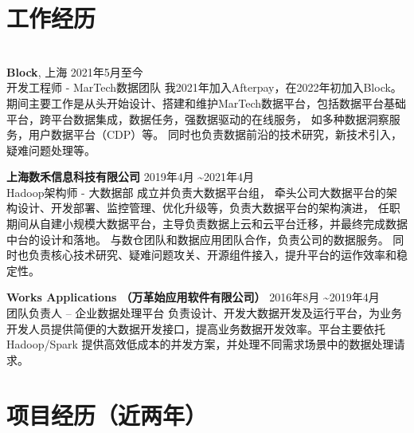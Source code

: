 \documentclass{res}[8.5pt]
\begin{document}
\thispagestyle{empty} %

\address{{\bf 地址:} 虹口区天宝路466弄, 200086 \hspace{0.25in}  {\bf 电话:} 18017661124 \hspace{0.25in}  {\bf   Email:} dd.famous@gmail.com}

\begin{resume}

\section{{工作经历}}
\vspace{-12pt}
\hrulefill\\
{\bf Block}, 上海 \hfill 2021年5月至今 \\
开发工程师 - MarTech数据团队  \hspace{0.25in} 我2021年加入Afterpay，在2022年初加入Block。
期间主要工作是从头开始设计、搭建和维护MarTech数据平台，包括数据平台基础平台，跨平台数据集成，数据任务，强数据驱动的在线服务，
如多种数据洞察服务，用户数据平台（CDP）等。
同时也负责数据前沿的技术研究，新技术引入，疑难问题处理等。

\vspace{-10pt}
{\bf 上海数禾信息科技有限公司} \hfill 2019年4月  \textasciitilde 2021年4月\\
Hadoop架构师 - 大数据部    \hspace{0.25in} 
成立并负责大数据平台组，
牵头公司大数据平台的架构设计、开发部署、监控管理、优化升级等，负责大数据平台的架构演进，
任职期间从自建小规模大数据平台，主导负责数据上云和云平台迁移，并最终完成数据中台的设计和落地。
与数仓团队和数据应用团队合作，负责公司的数据服务。
同时也负责核心技术研究、疑难问题攻关、开源组件接入，提升平台的运作效率和稳定性。


\vspace{-10pt}
{\bf Works Applications （万革始应用软件有限公司）} \hfill 2016年8月 \textasciitilde 2019年4月\\
团队负责人 – 企业数据处理平台 \hspace{0.25in} 
负责设计、开发大数据开发及运行平台，为业务开发人员提供简便的大数据开发接口，提高业务数据开发效率。平台主要依托 Hadoop/Spark 提供高效低成本的并发方案，并处理不同需求场景中的数据处理请求。

\vspace{-10pt}
\section{{项目经历（近两年）}}
\vspace{-12pt}
\hrulefill\\


\end{resume}
\end{document}
